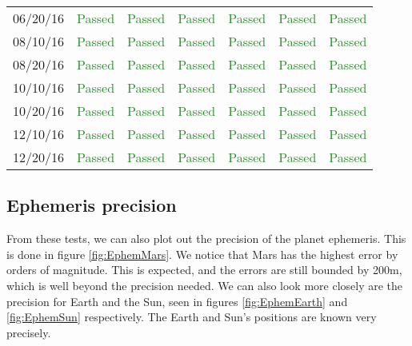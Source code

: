 \begin{table}[htbp]
\begin{tabular}{c | c | c | c | c | c | c}
		06/20/16 & \textcolor{ForestGreen}{Passed} & \textcolor{ForestGreen}{Passed} &  \textcolor{ForestGreen}{Passed}&  \textcolor{ForestGreen}{Passed} & \textcolor{ForestGreen}{Passed} &  \textcolor{ForestGreen}{Passed}\\
		08/10/16 & \textcolor{ForestGreen}{Passed} & \textcolor{ForestGreen}{Passed} &  \textcolor{ForestGreen}{Passed}&  \textcolor{ForestGreen}{Passed} & \textcolor{ForestGreen}{Passed} &  \textcolor{ForestGreen}{Passed}\\
		08/20/16 & \textcolor{ForestGreen}{Passed} & \textcolor{ForestGreen}{Passed} &  \textcolor{ForestGreen}{Passed}&  \textcolor{ForestGreen}{Passed} & \textcolor{ForestGreen}{Passed} &  \textcolor{ForestGreen}{Passed}\\
		10/10/16 & \textcolor{ForestGreen}{Passed} & \textcolor{ForestGreen}{Passed} &  \textcolor{ForestGreen}{Passed}&  \textcolor{ForestGreen}{Passed} & \textcolor{ForestGreen}{Passed} &  \textcolor{ForestGreen}{Passed}\\
		10/20/16 & \textcolor{ForestGreen}{Passed} & \textcolor{ForestGreen}{Passed} &  \textcolor{ForestGreen}{Passed}&  \textcolor{ForestGreen}{Passed} & \textcolor{ForestGreen}{Passed} &  \textcolor{ForestGreen}{Passed}\\
		12/10/16 & \textcolor{ForestGreen}{Passed} & \textcolor{ForestGreen}{Passed} &  \textcolor{ForestGreen}{Passed}&  \textcolor{ForestGreen}{Passed} & \textcolor{ForestGreen}{Passed} &  \textcolor{ForestGreen}{Passed}\\
		12/20/16 & \textcolor{ForestGreen}{Passed} & \textcolor{ForestGreen}{Passed} &  \textcolor{ForestGreen}{Passed}&  \textcolor{ForestGreen}{Passed} & \textcolor{ForestGreen}{Passed} &  \textcolor{ForestGreen}{Passed}\\
		\hline
	\end{tabular}
\end{table}


\subsection{Ephemeris precision}

From these tests, we can also plot out the precision of the planet ephemeris. This is done in figure \ref{fig:EphemMars}. We notice that Mars has the highest error by orders of magnitude. This is expected, and the errors are still bounded by 200m, which is well beyond the precision needed. We can also look more closely are the precision for Earth and the Sun, seen in figures  \ref{fig:EphemEarth} and  \ref{fig:EphemSun} respectively. The Earth and Sun's positions are known very precisely. 









